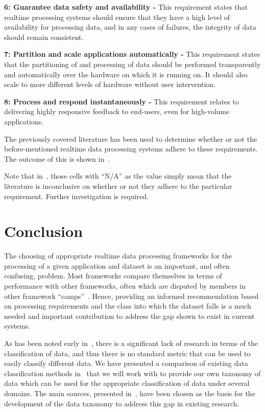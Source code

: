 \documentclass[a4paper,11pt]{article}
\begin{document}
\noindent \textbf{6: Guarantee data safety and availability -} This requirement states that realtime processing systems
should ensure that they have a high level of availability for processing data, and in any cases of failures, the integrity
of data should remain consistent.

\noindent \textbf{7: Partition and scale applications automatically -} This requirement states that the partitioning of
and processing of data should be performed transparently and automatically over the hardware on which it is running on.
It should also scale to more different levels of hardware without user intervention.

\noindent \textbf{8: Process and respond instantaneously -} This requirement relates to delivering highly responsive
feedback to end-users, even for high-volume applications.

The previously covered literature has been used to determine whether or not the before-mentioned realtime data processing
systems adhere to these requirements. The outcome of this is shown in~.

Note that in~, those cells with ``N/A'' as the value simply mean that the literature
is inconclusive on whether or not they adhere to the particular requirement. Further investigation is required.






\section{Conclusion} %
\label{sec:conclusion}

The choosing of appropriate realtime data processing frameworks for the processing of a given application and dataset
is an important, and often confusing, problem. Most frameworks compare themselves in terms of performance with other
frameworks, often which are disputed by members in other framework ``camps''~\cite{web_slideshare_b,web_slideshare_a}.
Hence, providing an informed recommendation based on processing requirements and the class into which the dataset
falls is a much needed and important contribution to address the gap shown to exist in current systems.

As has been noted early in~, there is a significant lack of research in terms of the
classification of data, and thus there is no standard metric that can be used to easily classify different data. We have
presented a comparison of existing data classification methods in~ that we will work with
to provide our own taxonomy of data which can be used for the appropriate classification of data under several domains.
The main sources, presented in~, have been chosen as the basis for the development of
the data taxonomy to address this gap in existing research.
\end{document}
